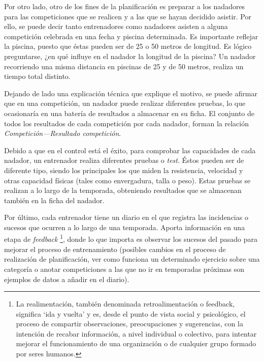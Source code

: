 	Por otro lado, otro de los fines de la planificación es preparar a los nadadores para las competiciones que se realicen y a las que se hayan decidido asistir. Por ello, se puede decir tanto entrenadores como nadadores asisten a alguna competición celebrada en una fecha y piscina determinada. Es importante reflejar la piscina, puesto que éstas pueden ser de 25 o 50 metros de longitud. Es lógico preguntarse, ¿en qué influye en el nadador la longitud de la piscina? Un nadador recorriendo una misma distancia en piscinas de 25 y de 50 metros, realiza un tiempo total distinto. 
	
	Dejando de lado una explicación técnica que explique el motivo, se puede afirmar que en una competición, un nadador puede realizar diferentes pruebas, lo que ocasionaría en una batería de resultados a almacenar en su ficha. El conjunto de todos los resultados de cada competición por cada nadador, forman la relación {\it Competición---Resultado competición}.
	
	Debido a que en el control está el éxito, para comprobar las capacidades de cada nadador, un entrenador realiza diferentes pruebas o {\it test}. Éstos pueden ser de diferente tipo, siendo los principales los que miden la resistencia, velocidad y otras capacidad físicas (tales como envergadura, talla o peso). Estas pruebas se realizan a lo largo de la temporada, obteniendo resultados que se almacenan también en la ficha del nadador.
	
	Por último, cada entrenador tiene un diario en el que registra las incidencias o sucesos que ocurren a lo largo de una temporada. Aporta información en una etapa de {\it feedback} \footnote{La realimentación, también denominada retroalimentación o feedback, significa ‘ida y vuelta’ y es, desde el punto de vista social y psicológico, el proceso de compartir observaciones, preocupaciones y sugerencias, con la intención de recabar información, a nivel individual o colectivo, para intentar mejorar el funcionamiento de una organización o de cualquier grupo formado por seres humanos.}, donde lo que importa es observar los sucesos del pasado para mejorar el proceso de entrenamiento (posibles cambios en el proceso de realización de planificación, ver como funciona un determinado ejercicio sobre una categoría o anotar competiciones a las que no ir en temporadas próximas son ejemplos de datos a añadir en el diario).    

	


